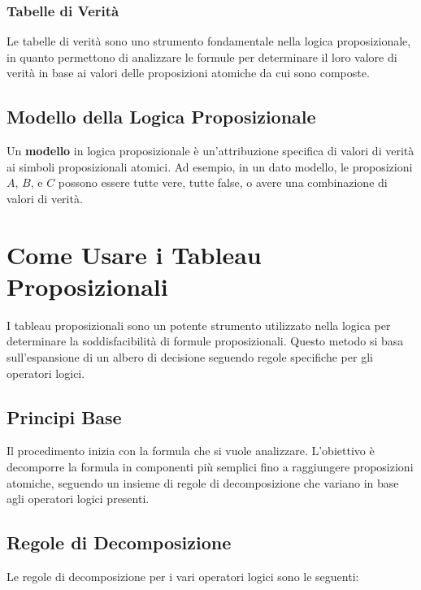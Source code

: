 \documentclass{article}
\begin{document}
\subsubsection{Tabelle di Verità}
Le tabelle di verità sono uno strumento fondamentale nella logica proposizionale, in quanto permettono di analizzare le formule per determinare il loro valore di verità in base ai valori delle proposizioni atomiche da cui sono composte.

\subsection{Modello della Logica Proposizionale}
Un \textbf{modello} in logica proposizionale è un'attribuzione specifica di valori di verità ai simboli proposizionali atomici. Ad esempio, in un dato modello, le proposizioni $A$, $B$, e $C$ possono essere tutte vere, tutte false, o avere una combinazione di valori di verità.
\newpage
\section{Come Usare i Tableau Proposizionali}

I tableau proposizionali sono un potente strumento utilizzato nella logica per determinare la soddisfacibilità di formule proposizionali. Questo metodo si basa sull'espansione di un albero di decisione seguendo regole specifiche per gli operatori logici.

\subsection{Principi Base}

Il procedimento inizia con la formula che si vuole analizzare. L'obiettivo è decomporre la formula in componenti più semplici fino a raggiungere proposizioni atomiche, seguendo un insieme di regole di decomposizione che variano in base agli operatori logici presenti.

\subsection{Regole di Decomposizione}

Le regole di decomposizione per i vari operatori logici sono le seguenti:
\end{document}
